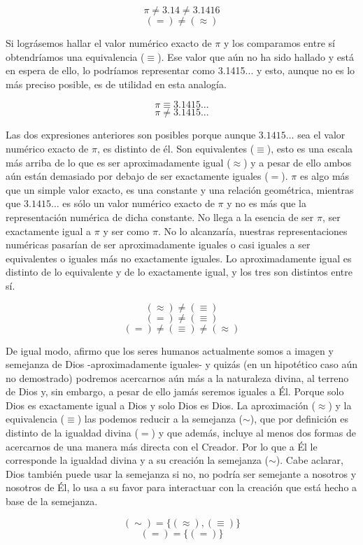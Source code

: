 \documentclass[letterpaper,13pt]{article}
\begin{document}
\[
\pi \neq 3.14 \neq 3.1416
\]
\[
(=) \neq (\approx)
\]

Si lográsemos hallar el valor numérico exacto de $\pi$ y los comparamos entre sí obtendríamos una equivalencia ($\equiv$). Ese valor que aún no ha sido hallado y está en espera de ello, lo podríamos representar como 3.1415... y esto, aunque no es lo más preciso posible, es de utilidad en esta analogía.

\[
\pi \equiv 3.1415...
\]
\[
\pi \neq 3.1415...
\]

Las dos expresiones anteriores son posibles porque aunque $3.1415\ldots$ sea el valor numérico exacto de $\pi$, es distinto de él. Son equivalentes ($\equiv$), esto es una escala más arriba de lo que es ser aproximadamente igual ($\approx$) y a pesar de ello ambos aún están demasiado por debajo de ser exactamente iguales ($=$). $\pi$ es algo más que un simple valor exacto, es una constante y una relación geométrica, mientras que $3.1415\ldots$ es sólo un valor numérico exacto de $\pi$ y no es más que la representación numérica de dicha constante. No llega a la esencia de ser $\pi$, ser exactamente igual a $\pi$ y ser como $\pi$. No lo alcanzaría, nuestras representaciones numéricas pasarían de ser aproximadamente iguales o casi iguales a ser equivalentes o iguales más no exactamente iguales. Lo aproximadamente igual es distinto de lo equivalente y de lo exactamente igual, y los tres son distintos entre sí.

\[
(\approx) \neq (\equiv)
\]
\[
(=) \neq (\equiv)
\]
\[
(=) \neq (\equiv) \neq (\approx)
\]

De igual modo, afirmo que los seres humanos actualmente somos a imagen y semejanza de Dios -aproximadamente iguales- y quizás (en un hipotético caso aún no demostrado) podremos acercarnos aún más a la naturaleza divina, al terreno de Dios y, sin embargo, a pesar de ello jamás seremos iguales a Él. Porque solo Dios es exactamente igual a Dios y solo Dios es Dios. La aproximación ($\approx$) y la equivalencia ($\equiv$) las podemos reducir a la semejanza ($\sim$), que por definición es distinto de la igualdad divina ($=$) y que además, incluye al menos dos formas de acercarnos de una manera más directa con el Creador. Por lo que a Él le corresponde la igualdad divina y a su creación la semejanza ($\sim$). Cabe aclarar, Dios también puede usar la semejanza si no, no podría ser semejante a nosotros y nosotros de Él, lo usa a su favor para interactuar con la creación que está hecho a base de la semejanza.

\[
(\sim) = \{ (\approx), (\equiv) \}
\]
\[
(=) = \{ (=) \}
\]
\end{document}
